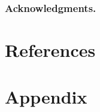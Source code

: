 \documentclass[runningheads,a4paper]{llncs}
\begin{document}



 
\subsubsection*{Acknowledgments.} 

\section{References}\label{references}
%



\section*{Appendix} 
\end{document}
